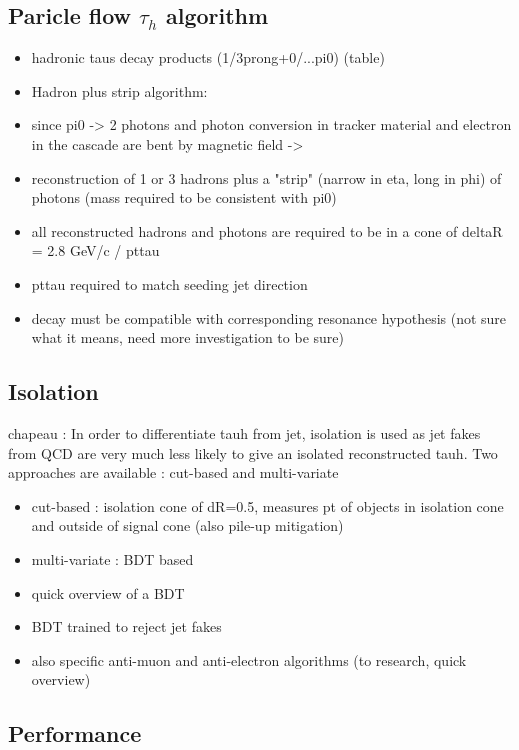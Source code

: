 \subsection{Paricle flow $\tau_{h}$ algorithm}

\begin{itemize}
    \item hadronic taus decay products (1/3prong+0/...pi0) (table)
    \item Hadron plus strip algorithm:
    \item since pi0 -> 2 photons and photon conversion in tracker material and electron in the cascade are bent by magnetic field ->
    \item reconstruction of 1 or 3 hadrons plus a "strip" (narrow in eta, long in phi) of photons (mass required to be consistent with pi0)
    \item all reconstructed hadrons and photons are required to be in a cone of deltaR = 2.8 GeV/c / pttau
    \item pttau required to match seeding jet direction
    \item decay must be compatible with corresponding resonance hypothesis (not sure what it means, need more investigation to be sure)
\end{itemize}

\subsection{Isolation}
chapeau : In order to differentiate tauh from jet, isolation is used as jet fakes from QCD are very much less likely to give an isolated reconstructed tauh. Two approaches are available : cut-based and multi-variate

\begin{itemize}
    \item cut-based : isolation cone of dR=0.5, measures pt of objects in isolation cone and outside of signal cone (also pile-up mitigation)
    \item multi-variate : BDT based
    \item quick overview of a BDT
    \item BDT trained to reject jet fakes
    \item also specific anti-muon and anti-electron algorithms (to research, quick overview)
\end{itemize}

\subsection{Performance}

